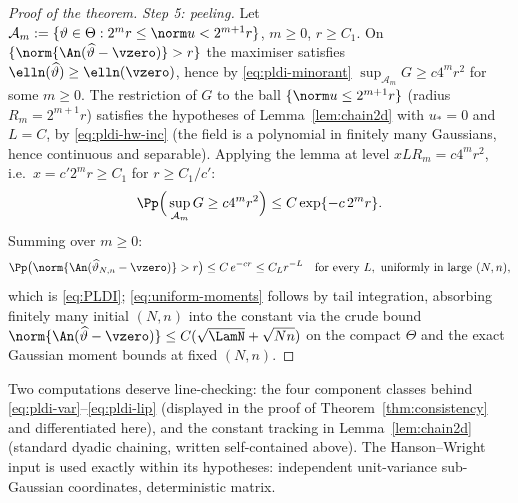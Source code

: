 \begin{proof}[Proof of the theorem]
\emph{Step 5: peeling.}
Let $\mathcal A_m:=\{\vartheta\in\Theta:2^mr\le\norm u<2^{m+1}r\}$,
$m\ge0$, $r\ge C_1$. On $\{\norm{\An(\widehat\vartheta-\vzero)}>r\}$ the
maximiser satisfies $\elln(\widehat\vartheta)\ge\elln(\vzero)$, hence by
\eqref{eq:pldi-minorant}
$\sup_{\mathcal A_m}G\ge c4^mr^2$ for some $m\ge0$. The restriction of $G$
to the ball $\{\norm u\le2^{m+1}r\}$ (radius $R_m=2^{m+1}r$) satisfies the
hypotheses of Lemma~\ref{lem:chain2d} with $u_\ast=0$ and $L=C$, by
\eqref{eq:pldi-hw-inc} (the field is a polynomial in finitely many
Gaussians, hence continuous and separable). Applying the lemma at level
$xLR_m=c4^mr^2$, i.e.\ $x=c'2^mr\ge C_1$ for $r\ge C_1/c'$:
\[
 \Pp\Big(\sup_{\mathcal A_m}G\ge c4^mr^2\Big)
 \le C\exp\{-c\,2^mr\}.
\]
Summing over $m\ge0$:
\[
 \Pp\big(\norm{\An(\widehat\vartheta_{N,n}-\vzero)}>r\big)
 \le C\,e^{-cr}\le C_Lr^{-L}
 \quad\text{for every }L,\ \text{uniformly in large }(N,n),
\]
which is \eqref{eq:PLDI}; \eqref{eq:uniform-moments} follows by tail
integration, absorbing finitely many initial $(N,n)$ into the constant via
the crude bound $\norm{\An(\widehat\vartheta-\vzero)}\le
C(\sqrt{\LamN}+\sqrt{Nn})$ on the compact $\Theta$ and the exact Gaussian
moment bounds at fixed $(N,n)$.
\end{proof}

\begin{remark}
Two computations deserve line-checking: the four component classes behind
\eqref{eq:pldi-var}--\eqref{eq:pldi-lip} (displayed in the proof of Theorem~\ref{thm:consistency} and differentiated here), and the constant tracking in
Lemma~\ref{lem:chain2d} (standard dyadic chaining, written self-contained
above). The Hanson--Wright input is used exactly within its hypotheses:
independent unit-variance sub-Gaussian coordinates, deterministic matrix.
\end{remark}
